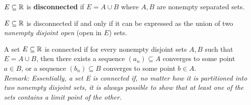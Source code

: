 \documentclass[11pt]{article}
\begin{document}
	\begin{definition}
		$E \subseteq \mathbb{R}$ is \textbf{disconnected} if $E = A \cup B$ where $A, B$ are nonempty separated sets.
	\end{definition}
	
	\begin{proposition}
		$E \subseteq \mathbb{R}$ is disconnected if and only if it can be expressed as the union of two \emph{nonempty disjoint open} (open in $E$) sets.
	\end{proposition}
	
	
	\begin{theorem}
		A set $E \subseteq \mathbb{R}$ is connected if for every nonempty disjoint sets $A, B$ such that $E = A \cup B$, then there exists a sequence $(a_n) \subseteq A$ converges to some point $a \in B$, or a sequence $(b_n) \subseteq B$ converges to some point $b \in A$. \\
		\emph{Remark: Essentially, a set E is connected if, no matter how it is partitioned into two nonempty disjoint sets, it is always possible to show that at least one of the sets contains a limit point of the other.}
	\end{theorem}
	
\end{document}
